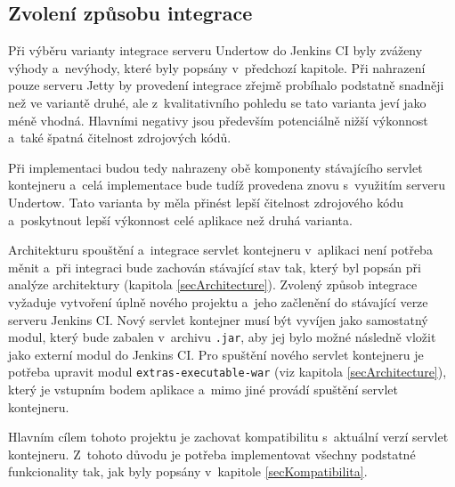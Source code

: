        \subsection{Zvolení způsobu integrace}
            Při výběru varianty integrace serveru Undertow do Jenkins CI byly zváženy
            výhody a~nevýhody, které byly popsány v~předchozí kapitole. Při nahrazení pouze serveru Jetty
            by provedení integrace zřejmě probíhalo podstatně snadněji než ve variantě druhé,
            ale z~kvalitativního pohledu se tato varianta jeví jako méně vhodná. 
            Hlavními 
            negativy jsou především potenciálně nižší výkonnost a~také špatná čitelnost
            zdrojových kódů.

            Při implementaci budou tedy nahrazeny obě komponenty stávajícího servlet kontejneru
            a~celá implementace bude tudíž provedena znovu s~využitím serveru Undertow. Tato
            varianta by měla přinést lepší čitelnost zdrojového kódu a~poskytnout 
            lepší výkonnost celé aplikace než druhá varianta.


            \medskip
            Architekturu spouštění a~integrace servlet kontejneru v~aplikaci není potřeba měnit a~při integraci bude
            zachován stávající stav tak, který byl popsán při analýze architektury (kapitola \ref{secArchitecture}).
            Zvolený způsob integrace vyžaduje vytvoření úplně nového projektu a~jeho začlenění do stávající
            verze serveru Jenkins CI. Nový servlet kontejner musí být vyvíjen jako samostatný modul,
            který bude zabalen v~archivu \texttt{.jar}, aby jej bylo možné následně vložit jako externí modul do Jenkins CI.
            Pro spuštění nového servlet kontejneru
            je potřeba upravit modul \texttt{extras-executable-war} (viz kapitola \ref{secArchitecture}), který
            je vstupním bodem aplikace a~mimo jiné provádí spuštění servlet kontejneru.
            
            Hlavním cílem tohoto projektu je zachovat kompatibilitu s~aktuální verzí servlet kontejneru. Z~tohoto důvodu je 
            potřeba implementovat všechny podstatné funkcionality tak, jak byly popsány v~kapitole \ref{secKompatibilita}.
            












